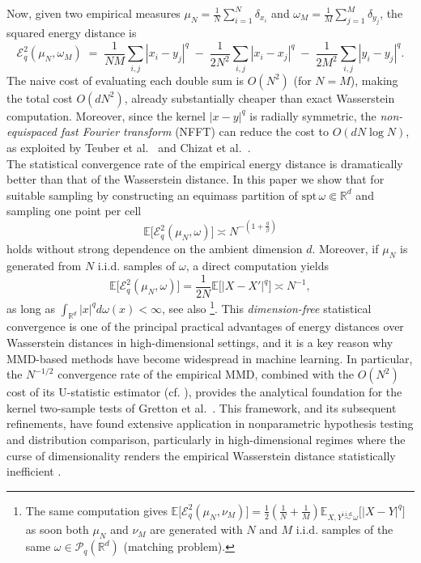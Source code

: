 \documentclass[12pt,a4paper,oneside]{amsart}
\theoremstyle{plain}
\theoremstyle{definition}
\numberwithin{equation}{section}
\numberwithin{figure}{section}
\numberwithin{table}{section}
\theoremstyle{remark}
\newcommand{\R}{\mathbb{R}}
\newcommand{\E}{\mathbb{E}}
\newcommand{\expAhlfors}{\beta}
\begin{document}
Now, given two empirical measures $\mu_N = \frac1N\sum_{i=1}^N \delta_{x_i}$ and
$\omega_M = \frac{1}{M}\sum_{j=1}^M \delta_{y_j}$, the squared energy distance is
\[
  \mathcal E_q^2(\mu_N, \omega_M)
  \;=\;
  \frac{1}{NM}\sum_{i,j} |x_i - y_j|^q
  \;-\;
  \frac{1}{2 N^2}\sum_{i,j} |x_i - x_j|^q
  \;-\;
  \frac{1}{2 M^2}\sum_{i,j} |y_i - y_j|^q.
\]
The naive cost of evaluating each double sum is $O(N^2)$ (for $N = M$), making the
total cost $O(dN^2)$, already substantially cheaper than exact Wasserstein computation.
Moreover, since the kernel $|x-y|^q$ is radially symmetric, the
\emph{non-equispaced fast Fourier transform} (NFFT) can reduce the cost to
$O(dN \log N)$, as exploited by Teuber et al.~\cite{teuber2011dithering} and
Chizat et al.~\cite{chizat2026quantitative}.
\\ 
The statistical convergence
rate of the empirical energy distance is dramatically better than that of the
Wasserstein distance. In this paper we  show that for suitable sampling by constructing an equimass partition of $\mathrm{spt}\,\omega \Subset \R^d$ and sampling one point per cell
\[
  \E\bigl[\mathcal E_q^2(\mu_N, \omega)\bigr] \asymp  N^{-(1+\frac{q}{\expAhlfors})}
\]
holds  without strong dependence on the ambient dimension $d$. Moreover, if $\mu_N$ is generated from $N$ i.i.d. samples of $\omega$, a direct computation yields
\begin{equation}\label{eq:stat}
    \E\bigl[\mathcal E_q^2(\mu_N, \omega)\bigr] = \frac{1}{2 N} \E\bigl[ |X- X'|^q] \asymp N^{-1},
\end{equation}
as long as $\int_{\R^d} |x|^q d\omega(x) < \infty$, see also \cite{szekely2013energy}\footnote{The same computation gives $\mathbb{E}\bigl[\mathcal{E}_q^2(\mu_N,\nu_M)\bigr] = \frac{1}{2}\left(\frac1N+\frac{1}{M}\right)\mathbb{E}_{X,Y\overset{\text{i.i.d.}}{\sim}\omega}\bigl[|X-Y|^q\bigr]$ as soon both $\mu_N$ and $\nu_M$ are generated  with $N$ and $M$ i.i.d. samples of the same $\omega \in \mathcal P_q(\R^d)$ (matching problem). }. This \emph{dimension-free} statistical
convergence is one of the principal practical advantages of energy distances over
Wasserstein distances in high-dimensional settings, and it is a key reason why
MMD-based methods have become widespread in machine learning.
In particular, the $N^{-1/2}$ convergence rate of the empirical MMD, combined with the $O(N^2)$ cost 
of its U-statistic estimator (cf. \cite[Lemma~6 and Eq.~(5)]{gretton2012kernel}), 
provides the analytical foundation for the kernel two-sample tests of 
Gretton et al.~\cite{gretton2012kernel,gretton2006kernel}. This framework, and its subsequent refinements, have found extensive 
application in nonparametric hypothesis testing and distribution comparison, 
particularly in high-dimensional regimes where the curse of dimensionality 
renders the empirical Wasserstein distance statistically inefficient
\cite{cheng2024kernel, yan2023kernel}.
\\
\end{document}
